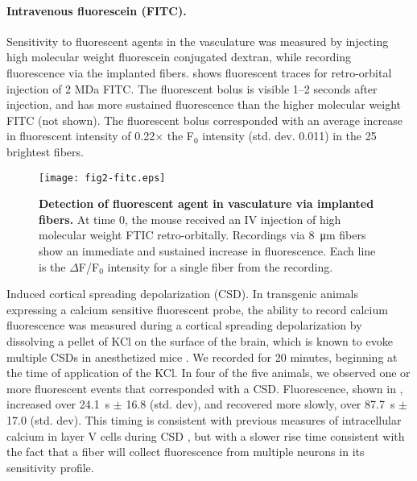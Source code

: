 \paragraph{Intravenous fluorescein (FITC).} Sensitivity to fluorescent agents in 
the vasculature was measured by injecting high molecular weight 
fluorescein conjugated dextran, while recording fluorescence via the 
implanted fibers.  shows fluorescent traces for retro-orbital 
injection of 2 MDa FITC. The fluorescent bolus is visible 1--2 seconds
 after injection, and has more sustained fluorescence than the higher 
molecular weight FITC (not shown). The fluorescent bolus corresponded 
with an average increase in fluorescent intensity of 0.22$\times$ the 
F$_0$ intensity (std. dev. 0.011) in the 25 brightest fibers.

\begin{figure}
\texttt{[image: fig2-fitc.eps]}
\caption[Recording of FITC in vasculature]{\textbf{Detection of fluorescent agent in vasculature via implanted fibers.} At
 time 0, the mouse received an IV injection of high molecular weight 
FTIC retro-orbitally. Recordings via 8~\si{\micro\meter} fibers show 
an immediate and sustained increase in fluorescence. Each line is the 
$\Delta$F/F$_0$ intensity for a single fiber from the recording.}
\label{fig:iv-fitc}
\end{figure}

Induced cortical spreading depolarization (CSD). In transgenic animals
 expressing a calcium sensitive fluorescent probe, the ability to 
record calcium fluorescence was measured during a cortical spreading 
depolarization by dissolving a pellet of KCl on the surface of the 
brain, which is known to evoke multiple CSDs in anesthetized mice 
\cite{Karatas:2013ir}. We recorded for 20 minutes, beginning at the 
time of application of the KCl. In four of the five animals, we 
observed one or more fluorescent events that corresponded with a CSD. 
Fluorescence, shown in , increased over 24.1~s $\pm$ 16.8 (std.
 dev), and recovered more slowly, over 87.7~s $\pm$ 17.0 (std. dev). 
This timing is consistent with previous measures of intracellular 
calcium in layer V cells during CSD \cite{Gniel:2010jn}, but with a 
slower rise time consistent with the fact that a fiber will collect 
fluorescence from multiple neurons in its sensitivity profile.

